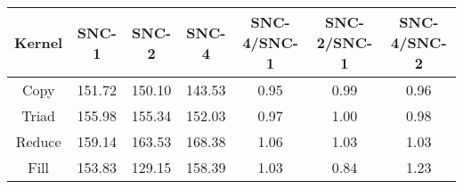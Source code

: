 \begin{tabular}{|c|c|c|c|c|c|c|}  \hline
Kernel&SNC-1&SNC-2&SNC-4 & SNC-4/SNC-1 & SNC-2/SNC-1 & SNC-4/SNC-2 \\ \hline 
Copy & 151.72 & 150.10 & 143.53  & 0.95 & 0.99 & 0.96 \\ \hline 
Triad & 155.98 & 155.34 & 152.03  & 0.97 & 1.00 & 0.98 \\ \hline 
Reduce & 159.14 & 163.53 & 168.38  & 1.06 & 1.03 & 1.03 \\ \hline 
Fill & 153.83 & 129.15 & 158.39  & 1.03 & 0.84 & 1.23 \\ \hline 
\end{tabular}
